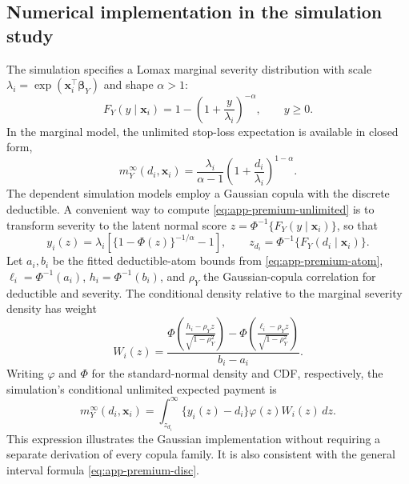 \documentclass[11pt]{article}
\begin{document}
{\subsection{Numerical implementation in the simulation study}
\label{app:premium-sim}

The simulation specifies a Lomax marginal severity distribution with
scale $\lambda_i=\exp(\boldsymbol{x}_i^{\top}\boldsymbol\beta_Y)$ and
shape $\alpha>1$:
\begin{equation}
 F_Y(y\mid\boldsymbol{x}_i)
   =1-\left(1+\frac{y}{\lambda_i}\right)^{-\alpha},\qquad y\ge0.
 \label{eq:app-premium-lomax}
\end{equation}
In the marginal model, the unlimited stop-loss expectation is available
in closed form,
\begin{equation}
 m_Y^{\infty}(d_i,\boldsymbol{x}_i)
 =\frac{\lambda_i}{\alpha-1}
   \left(1+\frac{d_i}{\lambda_i}\right)^{1-\alpha}.
 \label{eq:app-premium-lomax-closed}
\end{equation}
The dependent simulation models employ a Gaussian copula with the
discrete deductible. A convenient way to compute
\eqref{eq:app-premium-unlimited} is to transform severity to the latent
normal score $z=\Phi^{-1}\{F_Y(y\mid\boldsymbol{x}_i)\}$, so that
\begin{equation}
 y_i(z)=\lambda_i\left[\{1-\Phi(z)\}^{-1/\alpha}-1\right],
 \qquad z_{d_i}=\Phi^{-1}\{F_Y(d_i\mid\boldsymbol{x}_i)\}.
 \label{eq:app-premium-quantile}
\end{equation}
Let $a_i,b_i$ be the fitted deductible-atom bounds from
\eqref{eq:app-premium-atom},
$\ell_i=\Phi^{-1}(a_i)$, $h_i=\Phi^{-1}(b_i)$, and
$\rho_Y$ the Gaussian-copula correlation for deductible and severity.
The conditional density relative to the marginal severity density has
weight
\begin{equation}
 W_i(z)
 =\frac{
    \Phi\!\left(\frac{h_i-\rho_Yz}{\sqrt{1-\rho_Y^2}}\right)
   -\Phi\!\left(\frac{\ell_i-\rho_Yz}{\sqrt{1-\rho_Y^2}}\right)
   }{b_i-a_i}.
 \label{eq:app-premium-gaussian-weight}
\end{equation}
Writing $\varphi$ and $\Phi$ for the standard-normal density and CDF,
respectively, the simulation's conditional unlimited expected payment is
\begin{equation}
 m_Y^{\infty}(d_i,\boldsymbol{x}_i)
 =\int_{z_{d_i}}^{\infty}
    \bigl\{y_i(z)-d_i\bigr\}\varphi(z)W_i(z)\,dz.
 \label{eq:app-premium-sim-integral}
\end{equation}
This expression illustrates the Gaussian implementation without requiring
a separate derivation of every copula family. It is also consistent with
the general interval formula \eqref{eq:app-premium-disc}.

}
\end{document}
